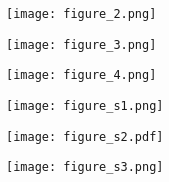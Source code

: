 \documentclass[11pt]{article}
\begin{document}
\begin{figure}
    \centering
        \texttt{[image: figure\_2.png]}
       \caption{}
      \label{fig2}
\end{figure}

\begin{figure}
    \centering
        \texttt{[image: figure\_3.png]}
       \caption{}
      \label{fig3}
\end{figure}

\begin{figure}
    \centering
        \texttt{[image: figure\_4.png]}
       \caption{}
      \label{fig4}
\end{figure}

\begin{figure}
    \centering
        \texttt{[image: figure\_s1.png]}
       \caption{}
      \label{figs1}
\end{figure}

\begin{figure}
    \centering
        \texttt{[image: figure\_s2.pdf]}
       \caption{}
      \label{figs2}
\end{figure}

\begin{figure}
    \centering
        \texttt{[image: figure\_s3.png]}
       \caption{}
      \label{figs3}
\end{figure}
\end{document}
